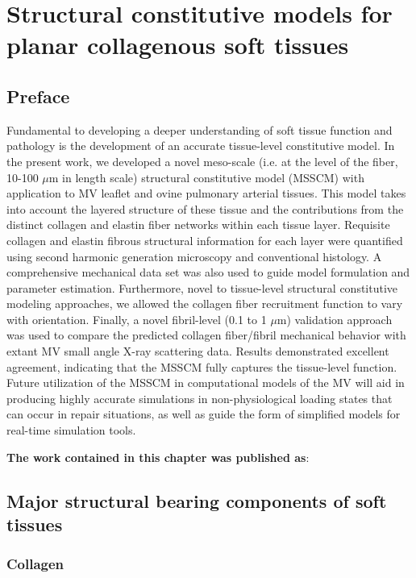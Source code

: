 \chapter{Structural constitutive models for planar collagenous soft tissues}


\section*{Preface}
%

    Fundamental to developing a deeper understanding of soft tissue function and pathology is the development of an accurate tissue-level constitutive model. In the present work, we developed a novel meso-scale (i.e. at the level of the fiber, 10-100 $\mu$m in length scale) structural constitutive model (MSSCM) with application to MV leaflet and ovine pulmonary arterial tissues. This model takes into account the layered structure of these tissue and the contributions from the distinct collagen and elastin fiber networks within each tissue layer. Requisite collagen and elastin fibrous structural information for each layer were quantified using second harmonic generation microscopy and conventional histology. A comprehensive mechanical data set was also used to guide model formulation and parameter estimation. Furthermore, novel to tissue-level structural constitutive modeling approaches, we allowed the collagen fiber recruitment function to vary with orientation. Finally, a novel fibril-level (0.1 to 1 $\mu$m) validation approach was used to compare the predicted collagen fiber/fibril mechanical behavior with extant MV small angle X-ray scattering data. Results demonstrated excellent agreement, indicating that the MSSCM fully captures the tissue-level function. Future utilization of the MSSCM in computational models of the MV will aid in producing highly accurate simulations in non-physiological loading states that can occur in repair situations, as well as guide the form of simplified models for real-time simulation tools.

\textbf{The work contained in this chapter was published as}:  %




\section{Major structural bearing components of soft tissues}
\subsection{Collagen}
